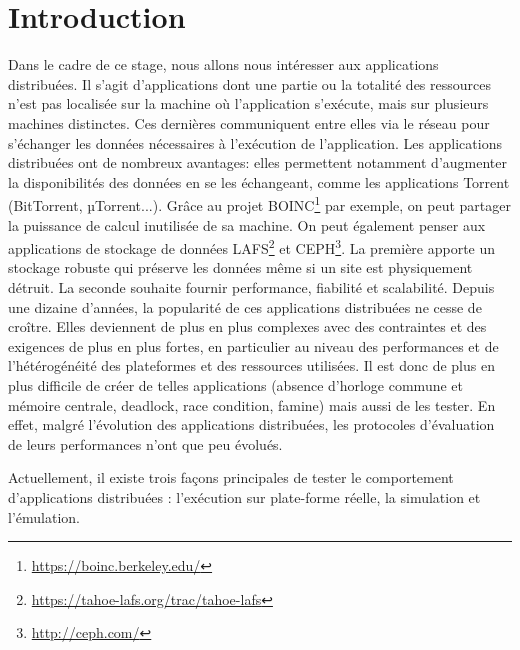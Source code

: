 \section{Introduction}



Dans le cadre de ce stage, nous allons nous intéresser aux applications
distribuées. Il s'agit d'applications dont une partie ou la totalité des
ressources n'est pas localisée sur la machine où l'application s'exécute, mais
sur plusieurs machines distinctes. Ces dernières communiquent entre elles via le
réseau pour s'échanger les données nécessaires à l'exécution de
l'application. Les applications distribuées ont de nombreux avantages: elles
permettent notamment d'augmenter la disponibilités des données en se les
échangeant, comme les applications Torrent (BitTorrent, $µ$Torrent...). Grâce au
projet BOINC\footnote{\url{https://boinc.berkeley.edu/}} par exemple, on peut
partager la puissance de calcul inutilisée de sa machine. On peut également
penser aux applications de stockage de données
LAFS\footnote{\url{https://tahoe-lafs.org/trac/tahoe-lafs}} et
CEPH\footnote{\url{http://ceph.com/}}. La première apporte un stockage robuste
qui préserve les données même si un site est physiquement détruit. La seconde
souhaite fournir performance, fiabilité et scalabilité. Depuis une dizaine
d'années, la popularité de ces applications distribuées ne cesse de
croître. Elles deviennent de plus en plus complexes avec des contraintes et des
exigences de plus en plus fortes, en particulier au niveau des performances et
de l'hétérogénéité des plateformes et des ressources utilisées. Il est donc de
plus en plus difficile de créer de telles applications (absence d'horloge
commune et mémoire centrale, deadlock, race condition, famine) mais aussi de les
tester.  En effet, malgré l'évolution des applications distribuées, les
protocoles d'évaluation de leurs performances n'ont que peu évolués.
\newline

Actuellement, il existe trois façons principales de tester le comportement
d'applications distribuées \citep{gustedt2009experimental}: l'exécution sur
plate-forme réelle, la simulation et l'émulation.

